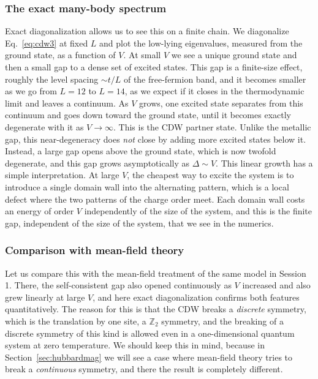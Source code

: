 \documentclass[lecture_notes.tex]{subfiles}
\begin{document}
\subsubsection{The exact many-body spectrum}
Exact diagonalization allows us to see this on a finite chain. We diagonalize Eq.~\eqref{eq:cdw3}
at fixed $L$ and plot the low-lying eigenvalues, measured from the ground state, as a function of
$V$. At small $V$ we see a unique ground state and then a small gap to a dense set of excited
states. This gap is a finite-size effect, roughly the level spacing $\sim t/L$ of the free-fermion
band, and it becomes smaller as we go from $L=12$ to $L=14$, as we expect if it closes in the
thermodynamic limit and leaves a continuum. As $V$ grows, one excited state separates from this
continuum and goes down toward the ground state, until it becomes exactly degenerate with it as
$V\to\infty$. This is the CDW partner state. Unlike the metallic gap, this near-degeneracy does
\emph{not} close by adding more excited states below it. Instead, a large gap opens above the
ground state, which is now twofold degenerate, and this gap grows asymptotically as
$\Delta \sim V$. This linear growth has a simple interpretation. At large $V$, the cheapest way to excite the
system is to introduce a single domain wall into the alternating pattern, which is a local defect
where the two patterns of the charge order meet. Each domain wall costs an energy of order $V$
independently of the size of the system, and this is the finite gap, independent of the size of the system,
that we see in the numerics.

\subsubsection{Comparison with mean-field theory}
Let us compare this with the mean-field treatment of the same model in Session 1. There, the
self-consistent gap also opened continuously as $V$ increased and also grew linearly at large $V$,
and here exact diagonalization confirms both features quantitatively. The reason for this is that
the CDW breaks a \emph{discrete} symmetry, which is the translation by one site, a $\mathbb Z_2$
symmetry, and the breaking of a discrete symmetry of this kind is allowed even in a
one-dimensional quantum system at zero temperature. We should keep this in mind, because in
Section~\ref{sec:hubbardmag} we will see a case where mean-field theory tries to break a
\emph{continuous} symmetry, and there the result is completely different.
\end{document}
